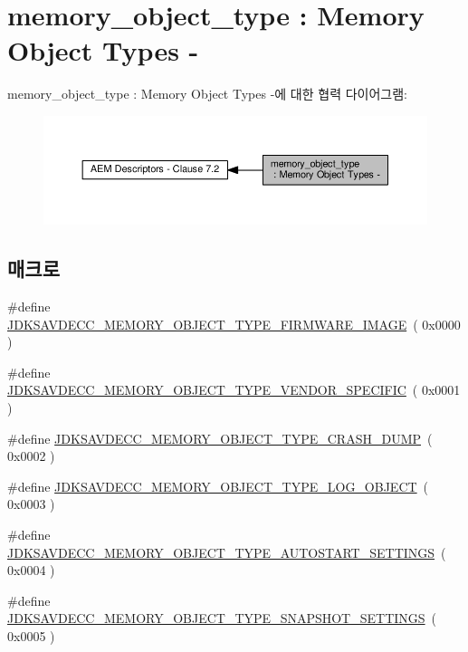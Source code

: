 \hypertarget{group__memory__object__type}{}\section{memory\+\_\+object\+\_\+type \+: Memory Object Types -\/}
\label{group__memory__object__type}
memory\+\_\+object\+\_\+type \+: Memory Object Types -\/에 대한 협력 다이어그램\+:
\nopagebreak
\begin{figure}[H]
\begin{center}
\leavevmode
\includegraphics[width=350pt]{group__memory__object__type}
\end{center}
\end{figure}
\subsection*{매크로}
\begin{DoxyCompactItemize}
\item 
\#define \hyperlink{group__memory__object__type_gaf4399c9599c53a25bdd2ec26652adf93}{J\+D\+K\+S\+A\+V\+D\+E\+C\+C\+\_\+\+M\+E\+M\+O\+R\+Y\+\_\+\+O\+B\+J\+E\+C\+T\+\_\+\+T\+Y\+P\+E\+\_\+\+F\+I\+R\+M\+W\+A\+R\+E\+\_\+\+I\+M\+A\+GE}~( 0x0000 )
\item 
\#define \hyperlink{group__memory__object__type_ga823abdb58e6bfe957041f59f2fe93a37}{J\+D\+K\+S\+A\+V\+D\+E\+C\+C\+\_\+\+M\+E\+M\+O\+R\+Y\+\_\+\+O\+B\+J\+E\+C\+T\+\_\+\+T\+Y\+P\+E\+\_\+\+V\+E\+N\+D\+O\+R\+\_\+\+S\+P\+E\+C\+I\+F\+IC}~( 0x0001 )
\item 
\#define \hyperlink{group__memory__object__type_gae2dc32392f37a5979259aee42a9cde44}{J\+D\+K\+S\+A\+V\+D\+E\+C\+C\+\_\+\+M\+E\+M\+O\+R\+Y\+\_\+\+O\+B\+J\+E\+C\+T\+\_\+\+T\+Y\+P\+E\+\_\+\+C\+R\+A\+S\+H\+\_\+\+D\+U\+MP}~( 0x0002 )
\item 
\#define \hyperlink{group__memory__object__type_ga2457e1f66a991f2be1184ac0ed77c034}{J\+D\+K\+S\+A\+V\+D\+E\+C\+C\+\_\+\+M\+E\+M\+O\+R\+Y\+\_\+\+O\+B\+J\+E\+C\+T\+\_\+\+T\+Y\+P\+E\+\_\+\+L\+O\+G\+\_\+\+O\+B\+J\+E\+CT}~( 0x0003 )
\item 
\#define \hyperlink{group__memory__object__type_ga6446f0548c3084407f1f77d3f8c686c5}{J\+D\+K\+S\+A\+V\+D\+E\+C\+C\+\_\+\+M\+E\+M\+O\+R\+Y\+\_\+\+O\+B\+J\+E\+C\+T\+\_\+\+T\+Y\+P\+E\+\_\+\+A\+U\+T\+O\+S\+T\+A\+R\+T\+\_\+\+S\+E\+T\+T\+I\+N\+GS}~( 0x0004 )
\item 
\#define \hyperlink{group__memory__object__type_ga8a82d943c1853ce85ec253359e33832f}{J\+D\+K\+S\+A\+V\+D\+E\+C\+C\+\_\+\+M\+E\+M\+O\+R\+Y\+\_\+\+O\+B\+J\+E\+C\+T\+\_\+\+T\+Y\+P\+E\+\_\+\+S\+N\+A\+P\+S\+H\+O\+T\+\_\+\+S\+E\+T\+T\+I\+N\+GS}~( 0x0005 )
\end{DoxyCompactItemize}


